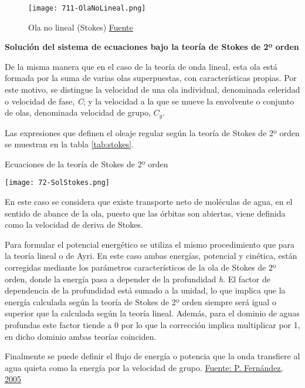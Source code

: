 \begin{figure}
\centering
\texttt{[image: 711-OlaNoLineal.png]}
\caption[Ola no lineal (Stokes)]{Ola no lineal (Stokes) \href{http://files.pfernandezdiez.es/EnergiasAlternativas/mar/PDFs/01Olas.pdf}{Fuente}}
\label{fig:olanolineal}
\end{figure}

\textbf{Solución del sistema de ecuaciones bajo la teoría de
Stokes de 2º orden}

De la misma manera que en el caso de la teoría de onda lineal, esta ola
está formada por la suma de varias olas superpuestas, con
características propias. Por este motivo, se distingue la velocidad de
una ola individual, denominada celeridad o velocidad de fase, \emph{C};
y la velocidad a la que se mueve la envolvente o conjunto de olas,
denominada velocidad de grupo, \(C_g\).

Las expresiones que definen el oleaje regular según la teoría de Stokes
de 2º orden se muestran en la tabla \autoref{tab:stokes}.

\begin{table}
\centering
\caption{Ecuaciones de la teoría de Stokes de 2º orden}
\texttt{[image: 72-SolStokes.png]}
\label{tab:stokes}
\end{table}


En este caso se considera que existe transporte neto de moléculas de
agua, en el sentido de abance de la ola, puesto que las órbitas son
abiertas, viene definida como la velocidad de deriva de Stokes.

Para formular el potencial energético se utiliza el mismo procedimiento
que para la teoría lineal o de Ayri. En este caso ambas energías,
potencial y cinética, están corregidas mediante los parámetros
característicos de la ola de Stokes de 2º orden, donde la energía pasa a
depender de la profundidad \emph{h}. El factor de dependencia de la
profundidad está sumado a la unidad, lo que implica que la energía
calculada según la teoría de Stokes de 2º orden siempre será igual o
superior que la calculada según la teoría lineal. Además, para el
dominio de aguas profundas este factor tiende a 0 por lo que la
corrección implica multiplicar por 1, en dicho dominio ambas teorías
coinciden.

Finalmente se puede definir el flujo de energía o potencia que la onda
transfiere al agua quieta como la energía por la velocidad de grupo.
\href{http://files.pfernandezdiez.es/EnergiasAlternativas/mar/PDFs/01Olas.pdf}{Fuente:
P. Fernández, 2005}

